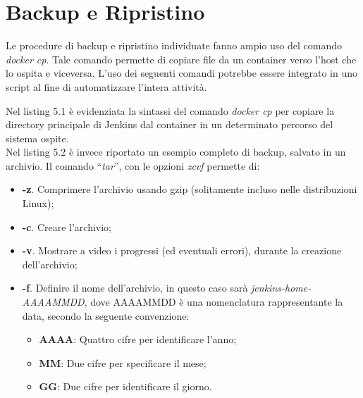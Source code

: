 \section{Backup e Ripristino}

Le procedure di backup e ripristino individuate fanno ampio uso del comando \textit{docker cp}\cite{site:docker-command-for-cli}. Tale comando permette di copiare file da un \gls{container} verso l'\gls{host} che lo ospita e viceversa. L'uso dei seguenti comandi potrebbe essere integrato in uno script al fine di automatizzare l'intera attività.

  

Nel listing 5.1 è evidenziata la sintassi del comando \textit{docker cp} per copiare la directory principale di Jenkins dal \gls{container} in un determinato percorso del sistema ospite. \\ 

Nel listing 5.2 è invece riportato un esempio completo di backup, salvato in un archivio. Il comando ``\textit{tar}'', con le opzioni \textit{zcvf} permette di:
\begin{itemize}
    \item \textbf{-z}. Comprimere l'archivio usando gzip (solitamente incluso nelle distribuzioni \gls{Linux});
    \item \textbf{-c}. Creare l'archivio;
    \item \textbf{-v}. Mostrare a video i progressi (ed eventuali errori), durante la creazione dell'archivio;
    \item \textbf{-f}. Definire il nome dell'archivio, in questo caso sarà \textit{jenkins-home-AAAAMMDD}, dove
    AAAAMMDD è una nomenclatura rappresentante la data, secondo la seguente convenzione:
    \begin{itemize}
        \item \textbf{AAAA}: Quattro cifre per identificare l'anno;
        \item \textbf{MM}: Due cifre per specificare il mese;
        \item \textbf{GG}: Due cifre per identificare il giorno.
    \end{itemize}
\end{itemize}

  

